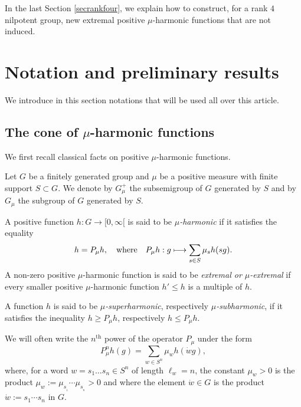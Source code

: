 \documentclass[11pt]{article}
\numberwithin{equation}{section}
\def\mto{\mathchoice{\longmapsto}{\mapsto}{\mapsto}{\mapsto}}
\theoremstyle{definition}
\let\bq\relax
\let\eq\relax
\let\ra\to
\begin{document}
In the last Section \ref{secrankfour}, we explain how to construct,
for a rank $4$ nilpotent group,
new extremal positive $\mu$-harmonic
functions that are not induced.

\section{Notation and preliminary results}
\label{secnotpre}

We introduce in this section notations
that will be used all over
this article.

\subsection{The cone of $\mu$-harmonic functions}
\label{secconhar}

\bq
We first recall classical facts on positive $\mu$-harmonic functions.
\eq

Let $G$ be a finitely generated group and $\mu$ be a positive
measure with finite support $S\subset G$.
We denote by $G_\mu^+$ the subsemigroup of $G$ generated by $S$
and by $G_\mu$ the subgroup of $G$ generated by $S$.

A positive function $h:G\ra [0,\infty[$ is said to be
\emph{$\mu$-harmonic} if it satisfies the equality
\begin{equation}
\label{eqnfghar}
h= P_{\mu}h,
\quad\text{where}\quad
P_{\mu}h: g\mto \sum_{s\in S}\mu_s h(sg).
\end{equation}
A non-zero positive $\mu$-harmonic function is said to be \emph{extremal
or $\mu$-extremal} if every smaller positive $\mu$-harmonic function
$h'\leq h$ is a multiple of $h$.

A function $h$ is said to be \emph{$\mu$-superharmonic},
respectively \emph{$\mu$-subharmonic},
if it satisfies the inequality $h\geq P_{\mu}h$, respectively $h\leq P_{\mu}h$.

We will often write the $n^\mathrm{th}$ power of the operator $P_\mu$ under the form
\begin{equation}
\label{eqnpmun}
P_{\mu}^nh(g)= \sum_{w\in S^n}\mu_w h(\dot{w}g),
\end{equation}
where, for a word $w=s_1\ldots s_n\in S^n$ of length $\ell_w=n$,
the constant $\mu_w>0$ is the product
$\mu_w:=\mu_{s_{_1}}\cdots \mu_{s_{_n}}>0$
and where the element $\dot{w}\in G$ is the product $\dot{w}:=s_1\cdots s_n$ in $G$.
\end{document}
